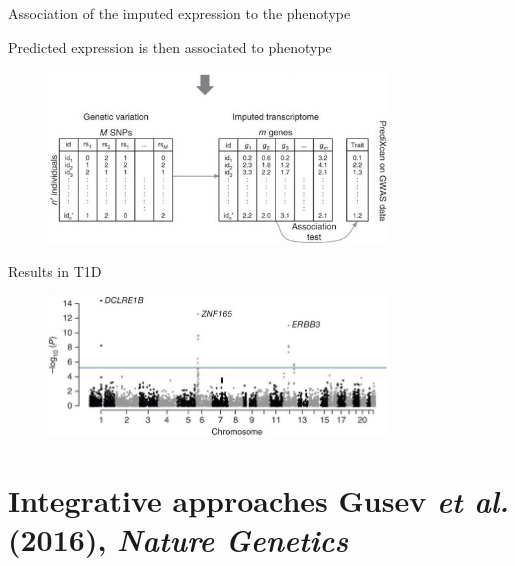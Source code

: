 \documentclass[aspectratio=169,12pt]{beamer}
\newcommand{\etal}{\textit{et al.}\xspace}
\begin{document}
\begin{frame}{Association of the imputed expression to the phenotype}

	Predicted expression is then associated to phenotype
	
	\begin{figure}
		\includegraphics[width=0.8\textwidth]{gamazon2015/2-grex_estimation_part2}
	\end{figure}


\end{frame}

\begin{frame}{Results in T1D}

	\begin{figure}
		\includegraphics[width=0.8\textwidth]{gamazon2015/7-t1d_associations_manhattan}
	\end{figure}


\end{frame}

\section{Integrative approaches \newline
\scriptsize Gusev \etal (2016), \textit{Nature Genetics}}
\end{document}
